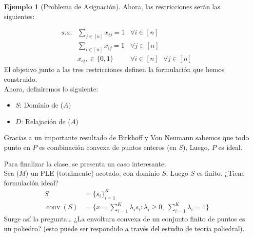 \documentclass[10pt]{article}
\DeclareMathOperator{\conv}{conv}
\theoremstyle{plain}
\theoremstyle{definition}
\newtheorem{eje}{Ejemplo}
\begin{document}
\begin{eje}[Problema de Asignación]
Ahora, las restricciones serán las siguientes:

\begin{equation*}
    \begin{array}{rll}
        s.a.&\sum\limits_{j\in[n]}x_{ij}=1&\forall i \in [n]\\
        &\sum\limits_{i\in [n]}x_{ij}=1&\forall j \in [n]\\
        &x_{ij},\in\{0,1\}&\forall i\in[n]\text{ }\forall j\in[n]
    \end{array}
\end{equation*}
El objetivo junto a las tres restricciones definen la formulación que hemos construido. \\

Ahora, definiremos lo siguiente:
\begin{itemize}
    \item $S$: Dominio de ($A$)
    \item $D$: Relajación de ($A$)
\end{itemize}


Gracias a un importante resultado de Birkhoff y Von Neumann sabemos que todo punto en $P$ es combinación convexa de puntos enteros (en $S$), Luego, $P$ es ideal.
\end{eje}

Para finalizar la clase, se presenta un caso interesante. \\
Sea ($M$) un PLE (totalmente) acotado, con dominio $S$. Luego $S$ es finito. ¿Tiene formulación ideal?
\begin{align*}
    S &=\{s_i\}_{i=1}^K\\
    \conv(S) &=\{x=\sum_{i=1}^K \lambda_i s_i:\lambda_i\geq 0,\ \sum_{i=1}^K \lambda_i=1\}
\end{align*}
Surge así la pregunta\ldots
¿La envoltura convexa de un conjunto finito de puntos es un poliedro? (esto puede ser respondido a través del estudio de teoría poliedral).
\end{document}
